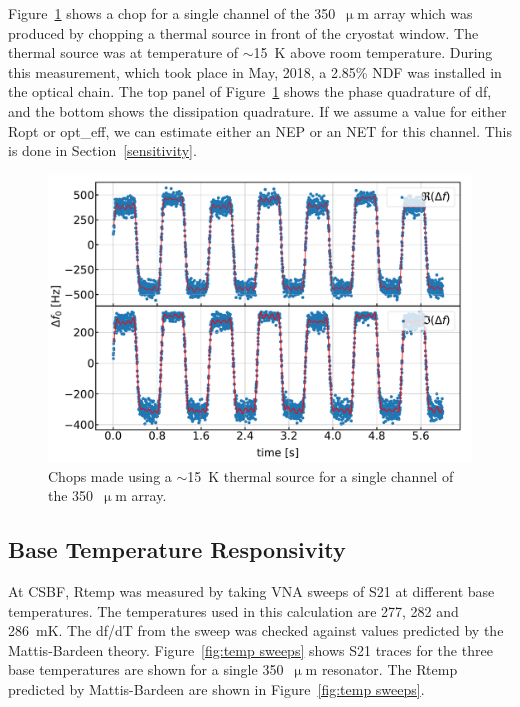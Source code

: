 Figure~\ref{fig:T chop} shows a chop for a single channel of the 350~$\upmu$m array which was produced by chopping a thermal source in front of the cryostat window. The thermal source was at temperature of $\sim$15~K above room temperature. During this measurement, which took place in May, 2018, a 2.85\% NDF was installed in the optical chain. The top panel of Figure~\ref{fig:T chop} shows the phase quadrature of \gls{df}, and the bottom shows the dissipation quadrature. If we assume a value for either \gls{Ropt} or \gls{opt_eff}, we can estimate either an NEP or an NET for this channel. This is done in Section~\ref{sensitivity}.

\begin{figure}[!htbp]
\centering
\includegraphics[width=\textwidth]{figures/blast_data/timestreams/may_15K_chop_c374}
\caption[~Chops made using a \macrocapwrap{$\sim$}15~K thermal source for a single channel of the 350~ array.]{Chops made using a $\sim$15~K thermal source for a single channel of the 350~$\upmu$m array.}
\label{fig:T chop}
\end{figure}

\subsection{Base Temperature Responsivity}

At CSBF, \gls{Rtemp} was measured by taking VNA sweeps of \gls{S21} at different base temperatures. The temperatures used in this calculation are 277, 282 and 286~mK. The df/dT from the sweep was checked against values predicted by the Mattis-Bardeen theory. Figure~\ref{fig:temp sweeps} shows \gls{S21} traces for the three base temperatures are shown for a single 350~$\upmu$m resonator. The \gls{Rtemp} predicted by Mattis-Bardeen are shown in Figure~\ref{fig:temp sweeps}.

